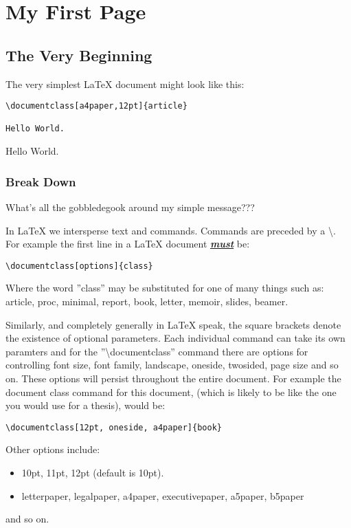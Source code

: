 \chapter{My First Page}

\section{The Very Beginning}
The very simplest LaTeX document might look like this:

\begin{verbatim}
\documentclass[a4paper,12pt]{article}

Hello World.

\end{verbatim}

\pagebreak
\thispagestyle{empty}
Hello World.
\pagebreak
\subsection{Break Down}
What's all the gobbledegook around my simple message???

In LaTeX we intersperse text and commands.  Commands are preceded by a \textbackslash. For example the first line in a LaTeX document \underline{\textbf{\emph{must}}} be:

\begin{verbatim}
\documentclass[options]{class}
\end{verbatim}

Where the word ''class'' may be substituted for one of many things such as: article, proc, minimal, report, book, letter, memoir, slides, beamer.

Similarly, and completely generally in LaTeX speak, the square brackets denote the existence of optional parameters. Each individual command can take its own paramters and for the ''{\textbackslash}documentclass'' command there are options for controlling font size, font family, landscape, oneside, twosided, page size and so on. These options will persist throughout the entire document. For example the document class command for this document, (which is likely to be like the one you would use for a thesis), would be:

\begin{verbatim}
\documentclass[12pt, oneside, a4paper]{book}
\end{verbatim}

Other options include:

\begin{itemize}
\item {10pt, 11pt, 12pt (default is 10pt).}
\item {letterpaper, legalpaper, a4paper, executivepaper, a5paper, b5paper}
\end{itemize}
and so on.

